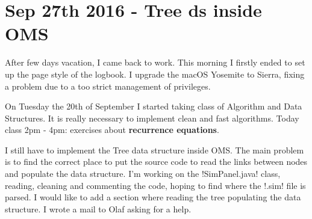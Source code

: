 \section{Sep 27th 2016 - Tree ds inside OMS}

After few days vacation, I came back to work. This morning I firstly
ended to set up the page style of the logbook. I upgrade the macOS
Yosemite to Sierra, fixing a problem due to a too strict management of
privileges.

On Tuesday the 20th of September I started taking class of Algorithm
and Data Structures. It is really necessary to implement clean and
fast algorithms. Today class 2pm - 4pm: exercises about
\textbf{recurrence equations}.\par\medskip

I still have to implement the Tree data structure inside OMS. The main
problem is to find the correct place to put the source code to read
the links between nodes and populate the data structure. I'm working
on the \inline!SimPanel.java! class, reading, cleaning and commenting
the code, hoping to find where the \inline!.sim! file is parsed. I
would like to add a section where reading the tree populating the data
structure. I wrote a mail to Olaf asking for a help.

